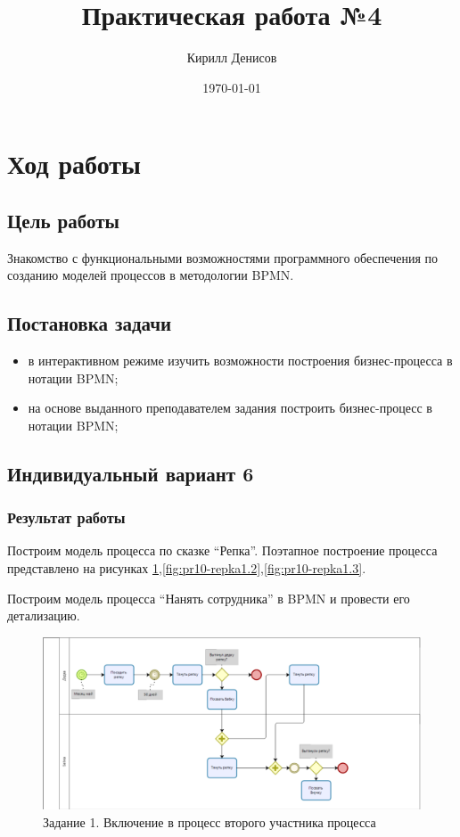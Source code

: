 \documentclass[a4paper,14pt]{extarticle}
\author{Кирилл Денисов}
\title{Практическая работа №4}
\date{\today}
\newcommand{\pathToCommonFolder}{/home/denilai/Documents/repos/latex/Common}
\begin{document}
	\thispagestyle{empty}
	
	\newpage
	\newpage
\section*{Ход работы}

\subsection*{Цель работы}
Знакомство с функциональными возможностями программного
обеспечения по созданию моделей процессов в методологии BPMN.

\subsection*{Постановка задачи}
\begin{itemize}
	\item в интерактивном режиме изучить возможности построения бизнес-процесса в нотации BPMN;
	\item на основе выданного преподавателем задания построить бизнес-процесс в нотации BPMN;
\end{itemize}



\subsection*{Индивидуальный вариант 6}

\subsubsection*{Результат работы}
\begin{problem}
	Построим модель процесса по сказке “Репка”. Поэтапное построение процесса представлено на рисунках \ref{fig:pr10-repka1.1},\ref{fig:pr10-repka1.2},\ref{fig:pr10-repka1.3}.
\end{problem}

\begin{problem}
	Построим модель процесса “Нанять сотрудника” в BPMN и провести его детализацию.
\end{problem}
	
	\begin{figure}[htpb]
		\centering
		\includegraphics[width=0.8\linewidth]{images/pr10-repka1.1}
		\caption{Задание 1. Включение в процесс второго участника процесса}
		\label{fig:pr10-repka1.1}
	\end{figure}
\end{document}
